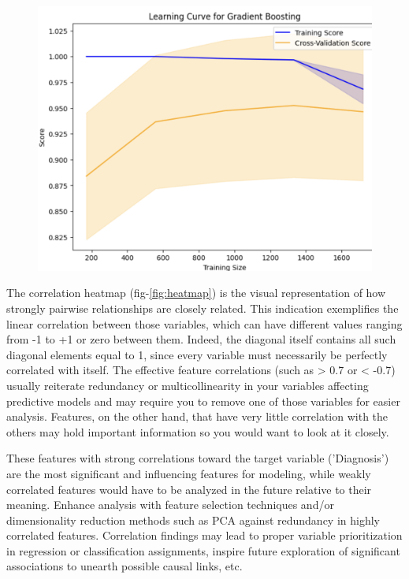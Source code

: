 \documentclass[conference]{IEEEtran} %
\begin{document}
\begin{figure}[ht]
    \centering
    \includegraphics[width=\linewidth]{Fig-09.pdf}
    \caption{}
    \label{fig:09}
\end{figure}
\FloatBarrier

The correlation heatmap (fig-\ref{fig:heatmap}) is the visual representation of how strongly pairwise relationships are closely related. This indication exemplifies the linear correlation between those variables, which can have different values ranging from -1 to +1 or zero between them. Indeed, the diagonal itself contains all such diagonal elements equal to 1, since every variable must necessarily be perfectly correlated with itself. The effective feature correlations (such as > 0.7 or < -0.7) usually reiterate redundancy or multicollinearity in your variables affecting predictive models and may require you to remove one of those variables for easier analysis. Features, on the other hand, that have very little correlation with the others may hold important information so you would want to look at it closely.

These features with strong correlations toward the target variable ('Diagnosis') are the most significant and influencing features for modeling, while weakly correlated features would have to be analyzed in the future relative to their meaning. Enhance analysis with feature selection techniques and/or dimensionality reduction methods such as PCA against redundancy in highly correlated features. Correlation findings may lead to proper variable prioritization in regression or classification assignments, inspire future exploration of significant associations to unearth possible causal links, etc.
\end{document}
